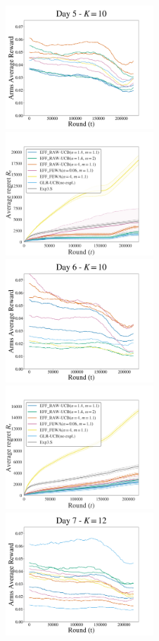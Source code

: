 \begin{figure}[p!]
\includegraphics[clip, width= 0.495\textwidth]{4Restless/fig/reward_plot_day5.pdf}
\includegraphics[clip, width= 0.495\textwidth]{4Restless/fig/DAY5.pdf}
\includegraphics[clip, width= 0.495\textwidth]{4Restless/fig/reward_plot_day6.pdf}
\includegraphics[clip, width= 0.495\textwidth]{4Restless/fig/DAY6.pdf}
\includegraphics[clip, width= 0.495\textwidth]{4Restless/fig/reward_plot_day7.pdf}

\end{figure}
